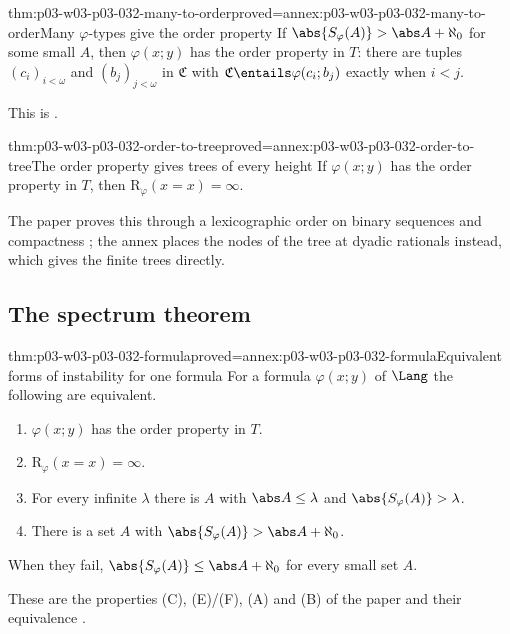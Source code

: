 \begin{hblemma}{thm:p03-w03-p03-032-many-to-order}{proved=annex:p03-w03-p03-032-many-to-order}{Many \(\varphi\)-types give the order property}
If \(\abs{S_\varphi(A)}>\abs A+\aleph_0\) for some small \(A\), then
\(\varphi(x;y)\) has the order property in \(T\): there are tuples
\((c_i)_{i<\omega}\) and \((b_j)_{j<\omega}\) in \(\mathfrak C\) with
\(\mathfrak C\entails\varphi(c_i;b_j)\) exactly when \(i<j\).
\end{hblemma}

This is \cite[Lemma~2.1, p.~298]{Shelah1971Stability}.

\begin{hblemma}{thm:p03-w03-p03-032-order-to-tree}{proved=annex:p03-w03-p03-032-order-to-tree}{The order property gives trees of every height}
If \(\varphi(x;y)\) has the order property in \(T\), then
\(\mathrm R_\varphi(x=x)=\infty\).
\end{hblemma}

The paper proves this through a lexicographic order on binary sequences and
compactness \cite[Lemma~2.2, pp.~298--299]{Shelah1971Stability}; the annex
places the nodes of the tree at dyadic rationals instead, which gives the
finite trees directly.

\subsection{The spectrum theorem}

\begin{hbtheorem}{thm:p03-w03-p03-032-formula}{proved=annex:p03-w03-p03-032-formula}{Equivalent forms of instability for one formula}
For a formula \(\varphi(x;y)\) of \(\Lang\) the following are equivalent.
\begin{enumerate}
  \item \(\varphi(x;y)\) has the order property in \(T\).
  \item \(\mathrm R_\varphi(x=x)=\infty\).
  \item For every infinite \(\lambda\) there is \(A\) with
        \(\abs A\leq\lambda\) and \(\abs{S_\varphi(A)}>\lambda\).
  \item There is a set \(A\) with \(\abs{S_\varphi(A)}>\abs A+\aleph_0\).
\end{enumerate}
When they fail, \(\abs{S_\varphi(A)}\leq\abs A+\aleph_0\) for every small
set \(A\).
\end{hbtheorem}

These are the properties (C), (E)/(F), (A) and (B) of the paper and their
equivalence \cite[Theorem~2.9, p.~303]{Shelah1971Stability}.

